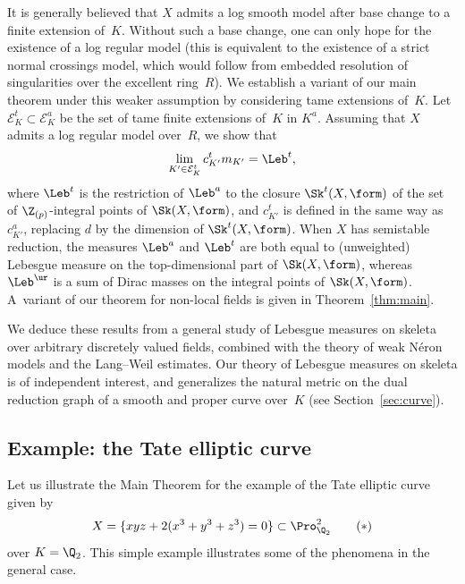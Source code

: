 It is generally believed that $X$ admits a log smooth model after base change to a finite extension of~$K$. Without such a base change, one can only hope for the existence of a log regular model (this is equivalent to the existence of a strict normal crossings model, which would follow from embedded resolution of singularities over the excellent ring~$R$). We establish a variant of our main theorem under this weaker assumption by considering tame extensions of~$K$.
Let $\mathcal{E}^t_K\subset\mathcal{E}^a_K$ be the set of tame finite extensions of~$K$ in $K^a$.
Assuming that $X$ admits a log regular model over~$R$, we show that
\begin{equation*}
\lim_{K'\in\mathcal{E}^t_K}c_{K'}^t m_{K'}=\Leb^t,
\end{equation*}
where $\Leb^t$ is the restriction of $\Leb^a$ to the closure $\Sk^t(X,\form)$ of the set of $\Z_{(p)}$-integral points of
$\Sk(X,\form)$, and $c_{K'}^t$ is defined in the same way as $c^a_{K'}$, replacing $d$ by the dimension of $\Sk^t(X,\form)$.
When $X$ has semistable reduction, the measures $\Leb^a$ and $\Leb^t$ are both equal to (unweighted) Lebesgue measure on the top-dimensional part of $\Sk(X,\form)$, whereas $\Leb^{\ur}$ is a sum of Dirac masses on the
integral points of $\Sk(X,\form)$.
A~variant of our theorem for non-local fields is given in Theorem~\ref{thm:main}.

We deduce these results from a general study of Lebesgue measures on skeleta over arbitrary discretely valued fields, combined with the theory of weak Néron models and the Lang--Weil estimates. Our theory of Lebesgue measures on skeleta is of independent interest, and generalizes the natural metric on the dual reduction graph of a smooth and proper curve over~$K$ (see Section~\ref{sec:curve}).

\subsection*{Example: the Tate elliptic curve}
Let us illustrate the Main Theorem for the example of the Tate elliptic curve given by
\begin{equation}\label{eq:Tate}
X=\{xyz+2(x^3+y^3+z^3)=0\}\subset\Pro^2_{\Q_2}\tag{$*$}
\end{equation}
over $K=\Q_2$. This simple example illustrates some of the phenomena in the general case.

